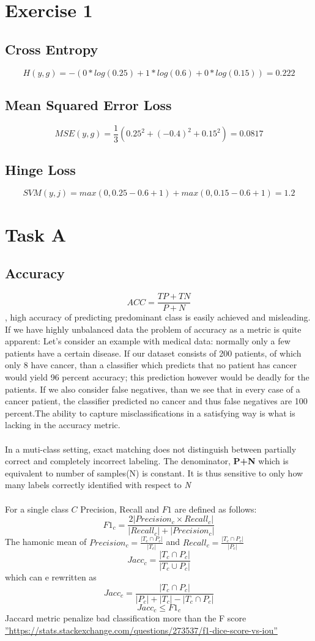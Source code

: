 \documentclass[10pt]{article}
\begin{document}
\section{Exercise 1}
\subsection{Cross Entropy}
$$H(y,g)= -(0*log(0.25)+1*log(0.6)+0*log(0.15))=0.222$$
\subsection{Mean Squared Error Loss}
$$MSE(y,g)= \frac{1}{3}(0.25^2+(-0.4)^2+0.15^2)=0.0817$$
\subsection{Hinge Loss}
$$SVM(y,j)=max(0,0.25-0.6+1)+max(0,0.15-0.6+1)= 1.2$$

\section{Task A}
\subsection{Accuracy}
$$ACC = \frac{TP+TN}{P+N}$$, high accuracy of predicting predominant class is easily achieved and misleading.
If we have highly unbalanced data the problem of accuracy as a metric is quite apparent:
Let's consider an example with medical data: normally only a few patients have a certain disease.
If our dataset consists of 200 patients, of which only 8 have cancer, than a classifier which predicts
that no patient has cancer would yield 96 percent accuracy;
this prediction however would be deadly for the patients.
If we also consider false negatives, than we see that in every case of a cancer patient,
the classifier predicted no cancer and thus false negatives are 100 percent.The ability to  capture misclassifications in a satisfying way is what is lacking in the accuracy metric.
\paragraph{}
In a muti-class setting, exact matching does not distinguish between partially correct and completely incorrect labeling.
The denominator, \textbf{P+N} which is equivalent to number of samples(N) is constant. It is thus sensitive to only how many labels correctly identified with respect to \textit{N}
\paragraph{}
For a single class $C$ Precision, Recall and  $F1$ are defined as follows:
 $$F1_c =\frac{2|{Precision_c}\times{Recall_c}|}{|Recall_c|+|Precision_c|}$$
 The hamonic mean of  $Precision_c =\frac{|{T_c}\cap{P_c}|}{|T_c|}$ and $Recall_c =\frac{|{T_c}\cap{P_c}|}{|P_c|}$
 $$Jacc_c =\frac{|{T_c}\cap{P_c}|}{|{T_c}\cup{P_c}|}$$
 which can e rewritten as
 $$Jacc_c =\frac{|{T_c}\cap{P_c}|}{|P_c|+|T_c|-|{T_c}\cap{P_c}|}$$
 $$Jacc_c\leq{F1_c}$$
Jaccard metric penalize bad classification more than the F score \hyperref[besteval]{''https://stats.stackexchange.com/questions/273537/f1-dice-score-vs-iou''}
\end{document}
